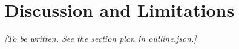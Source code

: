 \section{Discussion and Limitations}
\label{sec:discussion}
\textit{[To be written. See the section plan in outline.json.]}
